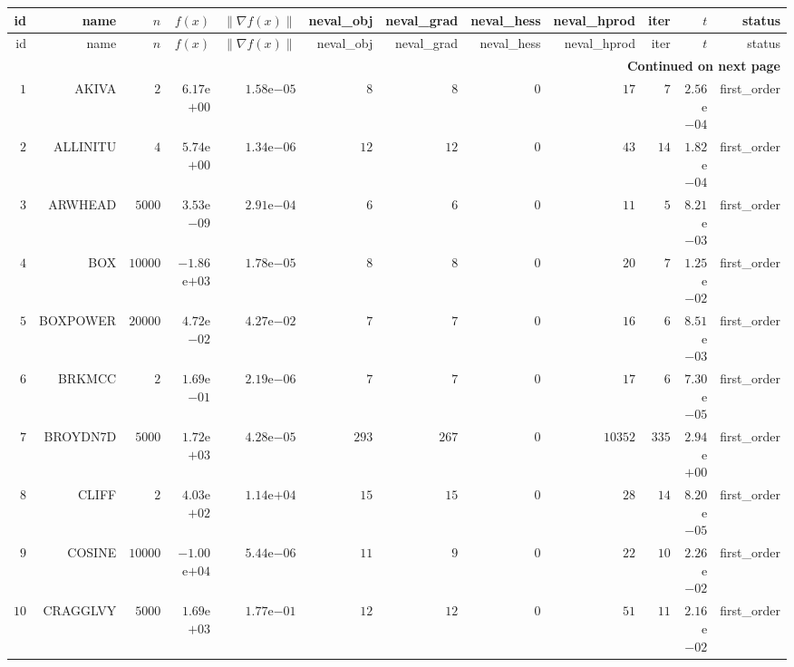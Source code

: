 \begin{longtable}{rrrrrrrrrrrr}
  \hline
  id & name & \(n\) & \(f(x)\) & \(\|\nabla f(x)\|\) & neval\_obj & neval\_grad & neval\_hess & neval\_hprod & iter & \(t\) & status \\\hline
  \endfirsthead
  \hline
  id & name & \(n\) & \(f(x)\) & \(\|\nabla f(x)\|\) & neval\_obj & neval\_grad & neval\_hess & neval\_hprod & iter & \(t\) & status \\\hline
  \endhead
  \hline
  \multicolumn{12}{r}{{\bfseries Continued on next page}}\\
  \hline
  \endfoot
  \endlastfoot
  \(     1\) & AKIVA & \(     2\) & \( 6.17\)e\(+00\) & \( 1.58\)e\(-05\) & \(     8\) & \(     8\) & \(     0\) & \(    17\) & \(     7\) & \( 2.56\)e\(-04\) & first\_order \\
  \(     2\) & ALLINITU & \(     4\) & \( 5.74\)e\(+00\) & \( 1.34\)e\(-06\) & \(    12\) & \(    12\) & \(     0\) & \(    43\) & \(    14\) & \( 1.82\)e\(-04\) & first\_order \\
  \(     3\) & ARWHEAD & \(  5000\) & \( 3.53\)e\(-09\) & \( 2.91\)e\(-04\) & \(     6\) & \(     6\) & \(     0\) & \(    11\) & \(     5\) & \( 8.21\)e\(-03\) & first\_order \\
  \(     4\) & BOX & \( 10000\) & \(-1.86\)e\(+03\) & \( 1.78\)e\(-05\) & \(     8\) & \(     8\) & \(     0\) & \(    20\) & \(     7\) & \( 1.25\)e\(-02\) & first\_order \\
  \(     5\) & BOXPOWER & \( 20000\) & \( 4.72\)e\(-02\) & \( 4.27\)e\(-02\) & \(     7\) & \(     7\) & \(     0\) & \(    16\) & \(     6\) & \( 8.51\)e\(-03\) & first\_order \\
  \(     6\) & BRKMCC & \(     2\) & \( 1.69\)e\(-01\) & \( 2.19\)e\(-06\) & \(     7\) & \(     7\) & \(     0\) & \(    17\) & \(     6\) & \( 7.30\)e\(-05\) & first\_order \\
  \(     7\) & BROYDN7D & \(  5000\) & \( 1.72\)e\(+03\) & \( 4.28\)e\(-05\) & \(   293\) & \(   267\) & \(     0\) & \( 10352\) & \(   335\) & \( 2.94\)e\(+00\) & first\_order \\
  \(     8\) & CLIFF & \(     2\) & \( 4.03\)e\(+02\) & \( 1.14\)e\(+04\) & \(    15\) & \(    15\) & \(     0\) & \(    28\) & \(    14\) & \( 8.20\)e\(-05\) & first\_order \\
  \(     9\) & COSINE & \( 10000\) & \(-1.00\)e\(+04\) & \( 5.44\)e\(-06\) & \(    11\) & \(     9\) & \(     0\) & \(    22\) & \(    10\) & \( 2.26\)e\(-02\) & first\_order \\
  \(    10\) & CRAGGLVY & \(  5000\) & \( 1.69\)e\(+03\) & \( 1.77\)e\(-01\) & \(    12\) & \(    12\) & \(     0\) & \(    51\) & \(    11\) & \( 2.16\)e\(-02\) & first\_order \\

\end{longtable}
